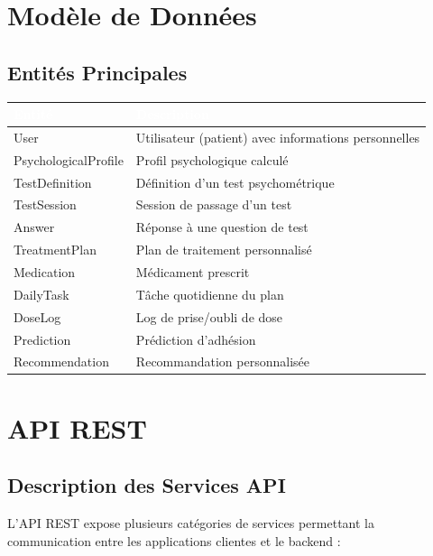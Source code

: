 \documentclass[12pt,a4paper]{report}
\begin{document}
\section{Modèle de Données}

\subsection{Entités Principales}

\begin{center}
\begin{tabularx}{\textwidth}{|l|X|}
    \hline
    \rowcolor{emsiblue}\textcolor{white}{\textbf{Entité}} & \textcolor{white}{\textbf{Description}} \\
    \hline
    User & Utilisateur (patient) avec informations personnelles \\
    \hline
    PsychologicalProfile & Profil psychologique calculé \\
    \hline
    TestDefinition & Définition d'un test psychométrique \\
    \hline
    TestSession & Session de passage d'un test \\
    \hline
    Answer & Réponse à une question de test \\
    \hline
    TreatmentPlan & Plan de traitement personnalisé \\
    \hline
    Medication & Médicament prescrit \\
    \hline
    DailyTask & Tâche quotidienne du plan \\
    \hline
    DoseLog & Log de prise/oubli de dose \\
    \hline
    Prediction & Prédiction d'adhésion \\
    \hline
    Recommendation & Recommandation personnalisée \\
    \hline
\end{tabularx}
\end{center}

\section{API REST}

\subsection{Description des Services API}

L'API REST expose plusieurs catégories de services permettant la communication entre les applications clientes et le backend : \\
\end{document}
